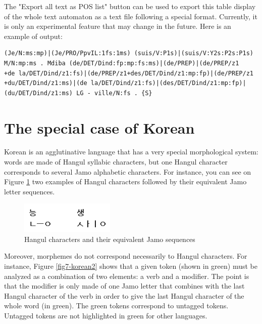 \bigskip
\noindent The "Export all text as POS list" button can be used to export this table display
of the whole text automaton as a text file following a special format. Currently, it is
only an experimental feature that may change in the future. Here is an example of output:

\begin{verbatim}
(Je/N:ms:mp)|(Je/PRO/PpvIL:1fs:1ms) (suis/V:P1s)|(suis/V:Y2s:P2s:P1s) 
M/N:mp:ms . Mdiba (de/DET/Dind:fp:mp:fs:ms)|(de/PREP)|(de/PREP/z1
+de la/DET/Dind/z1:fs)|(de/PREP/z1+des/DET/Dind/z1:mp:fp)|(de/PREP/z1
+du/DET/Dind/z1:ms)|(de la/DET/Dind/z1:fs)|(des/DET/Dind/z1:mp:fp)|
(du/DET/Dind/z1:ms) LG - ville/N:fs . {S}
\end{verbatim}



\section{The special case of Korean}
\label{section-korean}
Korean is an agglutinative language that has a very special morphological
system: words are made of Hangul syllabic characters, but one Hangul character
corresponds to several Jamo alphabetic characters. For instance, you can see on
Figure \ref{fig7-korean1} two examples of Hangul characters followed by their
equivalent Jamo letter sequences.

\begin{figure}[!ht]
\begin{center}
\includegraphics[width=4.5cm]{resources/img/fig7-korean1.png}
\caption{Hangul characters and their equivalent Jamo
sequences\label{fig7-korean1}}
\end{center}
\end{figure}

\noindent Moreover, morphemes do not correspond necessarily to Hangul
characters. For instance, Figure \ref{fig7-korean2} shows that a given token
(shown in green) must be analyzed as a combination of two elements: a verb and
a modifier. The point is that the modifier is only made of one Jamo letter that
combines with the last Hangul character of the verb in order to give the last
Hangul character of the whole word (in green). The green tokens correspond to
untagged tokens. Untagged tokens are not highlighted in green for other
languages.

